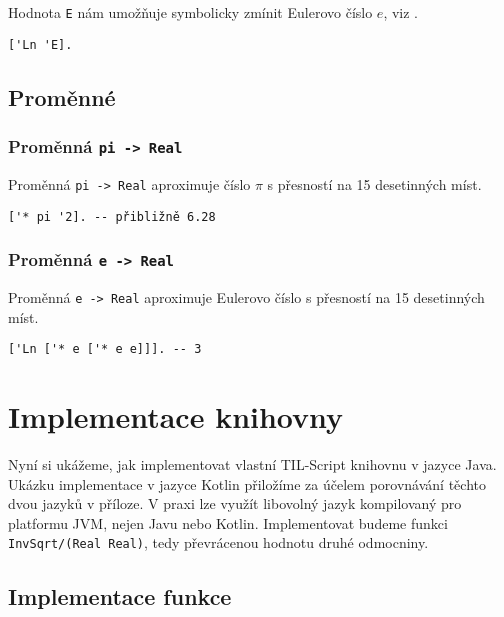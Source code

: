 Hodnota \lstinline{E} nám umožňuje symbolicky zmínit Eulerovo číslo $e$,
viz .

\begin{lstlisting}[caption={Ukázka využití E}]
['Ln 'E].
\end{lstlisting}

\subsection{Proměnné}

\subsubsection*{Proměnná \lstinline{pi -> Real}}

Proměnná \lstinline{pi -> Real} aproximuje číslo $\pi$ s přesností na 15 desetinných míst.

\begin{lstlisting}[caption={Ukázka využití proměnné pi}]
['* pi '2]. -- přibližně 6.28
\end{lstlisting}

\subsubsection*{Proměnná \lstinline{e -> Real}}

Proměnná \lstinline{e -> Real} aproximuje Eulerovo číslo s přesností na 15 desetinných míst.

\begin{lstlisting}[caption={Ukázka využití proměnné e}]
['Ln ['* e ['* e e]]]. -- 3
\end{lstlisting}

\section{Implementace knihovny}

Nyní si ukážeme, jak implementovat vlastní TIL-Script knihovnu v jazyce Java. Ukázku implementace
v jazyce Kotlin přiložíme za účelem porovnávání těchto dvou jazyků v příloze. V praxi lze využít
libovolný jazyk kompilovaný pro platformu JVM, nejen Javu nebo Kotlin. Implementovat budeme funkci
\lstinline{InvSqrt/(Real Real)}, tedy převrácenou hodnotu druhé odmocniny.

\subsection{Implementace funkce}

